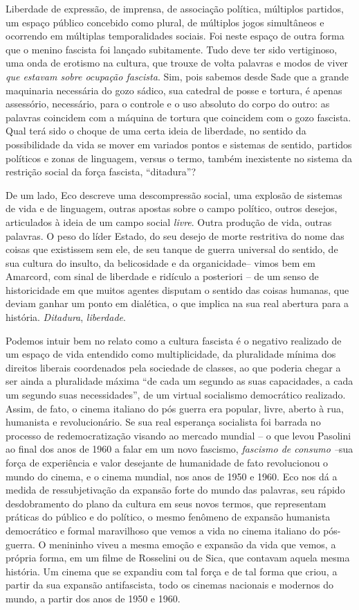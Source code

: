 Liberdade de expressão, de imprensa, de associação política, múltiplos
partidos, um espaço público concebido como plural, de múltiplos jogos
simultâneos e ocorrendo em múltiplas temporalidades sociais. Foi neste
espaço de outra forma que o menino fascista foi lançado subitamente.
Tudo deve ter sido vertiginoso, uma onda de erotismo na cultura, que
trouxe de volta palavras e modos de viver \emph{que estavam sobre
ocupação fascista}. Sim, pois sabemos desde Sade que a grande maquinaria
necessária do gozo sádico, sua catedral de posse e tortura, é apenas
assessório, necessário, para o controle e o uso absoluto do corpo do
outro: as palavras coincidem com a máquina de tortura que coincidem com
o gozo fascista. Qual terá sido o choque de uma certa ideia de
liberdade, no sentido da possibilidade da vida se mover em variados
pontos e sistemas de sentido, partidos políticos e zonas de linguagem,
versus o termo, também inexistente no sistema da restrição social da
força fascista, ``ditadura''?

De um lado, Eco descreve uma descompressão social, uma explosão de
sistemas de vida e de linguagem, outras apostas sobre o campo político,
outros desejos, articulados à ideia de um campo social \emph{livre}.
Outra produção de vida, outras palavras. O peso do líder Estado, do seu
desejo de morte restritiva do nome das coisas que existissem sem ele, de
seu tanque de guerra universal do sentido, de sua cultura do insulto, da
belicosidade e da organicidade-- vimos bem em Amarcord, com sinal de
liberdade e ridículo a posteriori -- de um senso de historicidade em que
muitos agentes disputam o sentido das coisas humanas, que deviam ganhar
um ponto em dialética, o que implica na sua real abertura para a
história. \emph{Ditadura}, \emph{liberdade}.

Podemos intuir bem no relato como a cultura fascista é o negativo
realizado de um espaço de vida entendido como multiplicidade, da
pluralidade mínima dos direitos liberais coordenados pela sociedade de
classes, ao que poderia chegar a ser ainda a pluralidade máxima ``de
cada um segundo as suas capacidades, a cada um segundo suas
necessidades'', de um virtual socialismo democrático realizado. Assim,
de fato, o cinema italiano do pós guerra era popular, livre, aberto à
rua, humanista e revolucionário. Se sua real esperança socialista foi
barrada no processo de redemocratização visando ao mercado mundial -- o
que levou Pasolini ao final dos anos de 1960 a falar em um novo
fascismo, \emph{fascismo de consumo --}sua força de experiência e valor
desejante de humanidade de fato revolucionou o mundo do cinema, e o
cinema mundial, nos anos de 1950 e 1960. Eco nos dá a medida de
ressubjetivação da expansão forte do mundo das palavras, seu rápido
desdobramento do plano da cultura em seus novos termos, que representam
práticas do público e do político, o mesmo fenômeno de expansão
humanista democrático e formal maravilhoso que vemos a vida no cinema
italiano do pós-guerra. O menininho viveu a mesma emoção e expansão da
vida que vemos, a própria forma, em um filme de Rosselini ou de Sica,
que contavam aquela mesma história. Um cinema que se expandiu com tal
força e de tal forma que criou, a partir da sua expansão antifascista,
todo os cinemas nacionais e modernos do mundo, a partir dos anos de 1950
e 1960.

